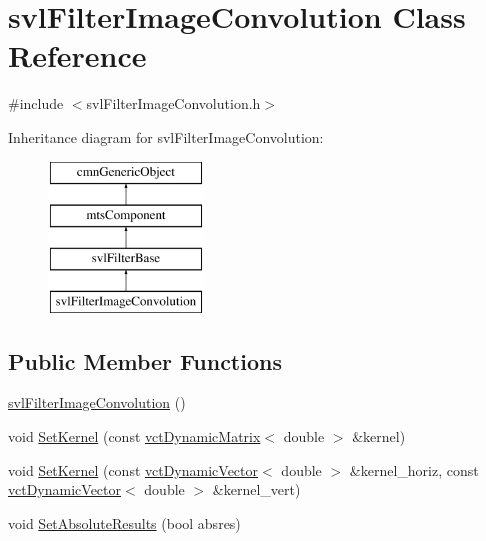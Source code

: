 \hypertarget{classsvl_filter_image_convolution}{\section{svl\-Filter\-Image\-Convolution Class Reference}
\label{classsvl_filter_image_convolution}
}


{\ttfamily \#include $<$svl\-Filter\-Image\-Convolution.\-h$>$}

Inheritance diagram for svl\-Filter\-Image\-Convolution\-:\begin{figure}[H]
\begin{center}
\leavevmode
\includegraphics[height=4.000000cm]{d7/d7c/classsvl_filter_image_convolution}
\end{center}
\end{figure}
\subsection*{Public Member Functions}
\begin{DoxyCompactItemize}
\item 
\hyperlink{classsvl_filter_image_convolution_aa28936888f31ce76409131883e685743}{svl\-Filter\-Image\-Convolution} ()
\item 
void \hyperlink{classsvl_filter_image_convolution_a67099f3b3b21330c766b023969c748b1}{Set\-Kernel} (const \hyperlink{classvct_dynamic_matrix}{vct\-Dynamic\-Matrix}$<$ double $>$ \&kernel)
\item 
void \hyperlink{classsvl_filter_image_convolution_a0a446098856d4f30acec5d7060355be0}{Set\-Kernel} (const \hyperlink{classvct_dynamic_vector}{vct\-Dynamic\-Vector}$<$ double $>$ \&kernel\-\_\-horiz, const \hyperlink{classvct_dynamic_vector}{vct\-Dynamic\-Vector}$<$ double $>$ \&kernel\-\_\-vert)
\item 
void \hyperlink{classsvl_filter_image_convolution_a150272f9c18e68bf1ee00094715f8c36}{Set\-Absolute\-Results} (bool absres)
\end{DoxyCompactItemize}
